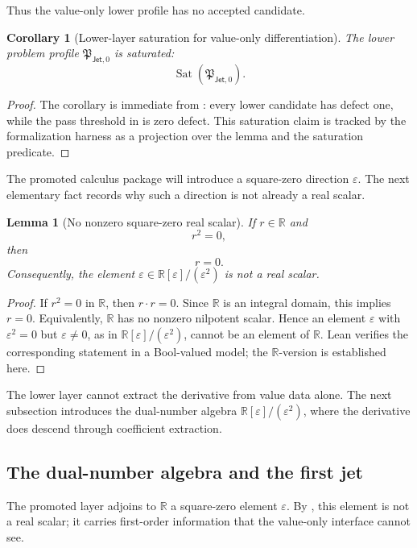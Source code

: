 \documentclass[11pt]{article}
\newcommand{\R}{\mathbb R}
\newcommand{\Dual}{\R[\varepsilon]/(\varepsilon^2)}
\newcommand{\Jet}{\mathsf{Jet}}
\newtheorem{lemma}[theorem]{Lemma}
\newtheorem{corollary}[theorem]{Corollary}
\theoremstyle{definition}
\begin{document}
Thus the value-only lower profile has no accepted candidate.

\begin{corollary}[Lower-layer saturation for value-only differentiation]
\label{cor:jet-lower-saturation}
The lower problem profile \(\mathfrak P_{\Jet,0}\) is saturated:
\[
\operatorname{Sat}(\mathfrak P_{\Jet,0}).
\]
\end{corollary}

\begin{proof}
The corollary is immediate from
: every lower candidate has defect
one, while the pass threshold in  is zero
defect.  This saturation claim is tracked by the formalization harness as a
projection over the lemma and the saturation predicate.
\end{proof}

The promoted calculus package will introduce a square-zero direction
\(\varepsilon\).  The next elementary fact records why such a direction is not
already a real scalar.

\begin{lemma}[No nonzero square-zero real scalar]
\label{lem:jet-no-real-nilpotent}
If \(r\in\mathbb R\) and
\[
r^2=0,
\]
then
\[
r=0.
\]
Consequently, the element \(\varepsilon\in\Dual\) is not a real scalar.
\end{lemma}

\begin{proof}
If \(r^2=0\) in \(\R\), then \(r\cdot r=0\).  Since \(\R\) is an integral
domain, this implies \(r=0\).  Equivalently, \(\R\) has no nonzero nilpotent
scalar.  Hence an element \(\varepsilon\) with \(\varepsilon^2=0\) but
\(\varepsilon\neq 0\), as in \(\Dual\), cannot be an element of \(\R\).  Lean
verifies the corresponding statement in a Bool-valued model; the \(\R\)-version
is established here.
\end{proof}

The lower layer cannot extract the derivative from value data alone.  The next
subsection introduces the dual-number algebra \(\Dual\), where the derivative
does descend through coefficient extraction.

\subsection{The dual-number algebra and the first jet}
\label{subsec:jet-dual-numbers-first-jet}

The promoted layer adjoins to \(\R\) a square-zero element \(\varepsilon\).  By
, this element is not a real scalar; it carries
first-order information that the value-only interface cannot see.
\end{document}
